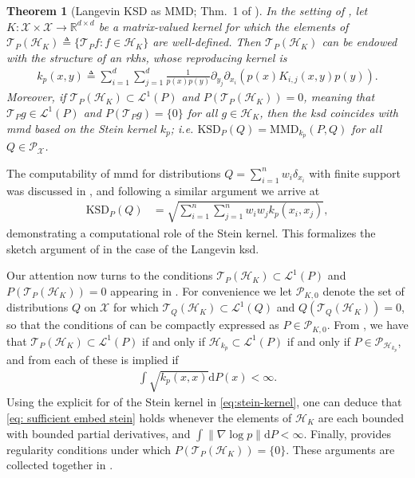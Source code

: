 \documentclass[12pt,paper=letter]{scrreprt}
\newtheorem{theorem}{Theorem}[chapter]
\def\defeq{\triangleq} %
\def\defn{\defeq} %
\newcommand{\p}{p} %
\newcommand{\langevin}{\mathcal{T}_P} %
\renewcommand{\k}{k}
\newcommand{\ks}{\k_{\p}}%
\def\H{\mathcal{H}}
\begin{document}
\begin{theorem}[Langevin KSD as MMD; Thm.~1 of \citealp{barp2022targeted}]\label{ksdDef}
    In the setting of , let $K : \mathcal{X} \times \mathcal{X} \rightarrow \mathbb{R}^{d \times d}$ be a matrix-valued kernel for which the elements of $\langevin(\H_K) \defeq  \{\langevin f : f \in \mathcal{H}_K\}$ are well-defined.
    Then $\langevin (\H_K)$ can be endowed with the structure of an \ac{rkhs}, whose reproducing kernel is
    \begin{align}\label{eq:stein-kernel}
        \ks(x,y) \defn
    \sum_{i=1}^d \sum_{j=1}^d \frac1{\p( x)\p(y)} \partial_{y_j} \partial_{x_i} \left( \p( x)  K_{i,j}( x, y) \p( y) \right).
    \end{align}
   Moreover, if $\mathcal{T}_P(\mathcal{H}_K) \subset \mathcal{L}^1(P)$ and $P(\mathcal{T}_P (\mathcal{H}_K)) = 0$, meaning that $\mathcal{T}_P g \in \mathcal{L}^1(P)$ and $P(\mathcal{T}_Pg) = \{0\}$ for all $g \in \mathcal{H}_K$, then the \ac{ksd} coincides with \ac{mmd} based on the \emph{Stein kernel} $k_p$; i.e. $\mathrm{KSD}_P(Q) = \mathrm{MMD}_{\ks}(P, Q)$ for all $Q \in \mathcal{P}_{\mathcal{X}}$.
\end{theorem}

The computability of \ac{mmd} for distributions $Q = \sum_{i=1}^n w_i \delta_{x_i}$ with finite support was discussed in , and following a similar argument we arrive at
\begin{align*}
    \mathrm{KSD}_P(Q) & = \sqrt{ \sum_{i=1}^n \sum_{j=1}^n w_i w_j k_p(x_i,x_j) } ,
\end{align*}
demonstrating a computational role of the Stein kernel.
This formalizes the sketch argument of  in the case of the Langevin \ac{ksd}.

Our attention now turns to the conditions $\mathcal{T}_P(\mathcal{H}_K) \subset \mathcal{L}^1(P)$ and $P(\mathcal{T}_P (\mathcal{H}_K)) = 0$ appearing in .
For convenience we let $\mathcal{P}_{K,0}$ denote the set of distributions $Q$ on $\mathcal{X}$ for which $\mathcal{T}_Q(\mathcal{H}_K) \subset \mathcal{L}^1(Q)$ and $Q(\mathcal{T}_Q (\mathcal{H}_K)) = 0$, so that the conditions of  can be compactly expressed as $P \in \mathcal{P}_{K,0}$.
From , we have that $\mathcal{T}_P(\mathcal{H}_K) \subset \mathcal{L}^1(P)$ if and only if $\mathcal{H}_{k_p} \subset \mathcal{L}^1(P)$ if and only if $P \in \mathcal{P}_{\mathcal{H}_{k_p}}$, and from  each of these is implied if 
\begin{align}
    \int \sqrt{k_p(x,x)} \mathrm{d}P(x) < \infty . \label{eq: sufficient embed stein}
\end{align}
Using the explicit for of the Stein kernel in \eqref{eq:stein-kernel}, one can deduce that \eqref{eq: sufficient embed stein} holds whenever the elements of $\mathcal{H}_K$ are each bounded with bounded partial derivatives, and $\int \|\nabla \log p\| \mathrm{d}P < \infty$.
Finally,  provides regularity conditions under which $P(\mathcal{T}_P(\mathcal{H}_K)) = \{0\}$.
These arguments are collected together in .
\end{document}
